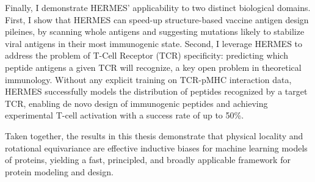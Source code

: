 Finally, I demonstrate HERMES' applicability to two distinct biological domains.
First, I show that HERMES can speed-up structure-based vaccine antigen design pileines, by scanning whole antigens
and suggesting mutations likely to stabilize viral antigens in their most immunogenic state.
Second, I leverage HERMES to address the problem of T-Cell Receptor (TCR) specificity:
predicting which peptide antigens a given TCR will recognize, a key open problem in theoretical immunology.
Without any explicit training on TCR-pMHC interaction data, HERMES successfully models the distribution of peptides
recognized by a target TCR, enabling de novo design of immunogenic peptides and achieving experimental T-cell activation
with a success rate of up to 50\%.

Taken together, the results in this thesis demonstrate that physical locality and rotational equivariance are effective
inductive biases for machine learning models of proteins, yielding a fast, principled, and broadly applicable framework
for protein modeling and design.
